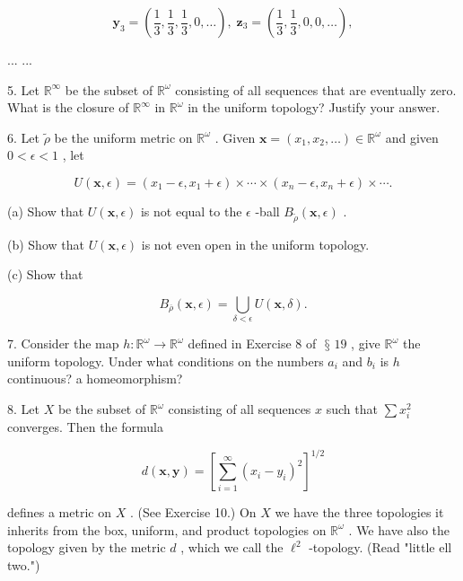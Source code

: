 \documentclass[10pt]{article}
\begin{document}
\[
{\mathbf{y}}_{3} = \left( {\frac{1}{3},\frac{1}{3},\frac{1}{3},0,\ldots }\right) ,\;{\mathbf{z}}_{3} = \left( {\frac{1}{3},\frac{1}{3},0,0,\ldots }\right) ,
\]

... ...

5. Let \({\mathbb{R}}^{\infty }\) be the subset of \({\mathbb{R}}^{\omega }\) consisting of all sequences that are eventually zero. What is the closure of \({\mathbb{R}}^{\infty }\) in \({\mathbb{R}}^{\omega }\) in the uniform topology? Justify your answer.

6. Let \(\widetilde{\rho }\) be the uniform metric on \({\mathbb{R}}^{\omega }\) . Given \(\mathbf{x} = \left( {{x}_{1},{x}_{2},\ldots }\right)  \in  {\mathbb{R}}^{\omega }\) and given \(0 < \epsilon  < 1\) , let

\[
U\left( {\mathbf{x},\epsilon }\right)  = \left( {{x}_{1} - \epsilon ,{x}_{1} + \epsilon }\right)  \times  \cdots  \times  \left( {{x}_{n} - \epsilon ,{x}_{n} + \epsilon }\right)  \times  \cdots .
\]

(a) Show that \(U\left( {\mathbf{x},\epsilon }\right)\) is not equal to the \(\epsilon\) -ball \({B}_{\widetilde{\rho }}\left( {\mathbf{x},\epsilon }\right)\) .

(b) Show that \(U\left( {\mathbf{x},\epsilon }\right)\) is not even open in the uniform topology.

(c) Show that

\[
{B}_{\overline{\rho }}\left( {\mathbf{x},\epsilon }\right)  = \mathop{\bigcup }\limits_{{\delta  < \epsilon }}U\left( {\mathbf{x},\delta }\right) .
\]

7. Consider the map \(h : {\mathbb{R}}^{\omega } \rightarrow  {\mathbb{R}}^{\omega }\) defined in Exercise 8 of \(\text{ § }{19}\) , give \({\mathbb{R}}^{\omega }\) the uniform topology. Under what conditions on the numbers \({a}_{i}\) and \({b}_{i}\) is \(h\) continuous? a homeomorphism?

8. Let \(X\) be the subset of \({\mathbb{R}}^{\omega }\) consisting of all sequences \(x\) such that \(\sum {x}_{i}^{2}\) converges. Then the formula

\[
d\left( {\mathbf{x},\mathbf{y}}\right)  = {\left\lbrack  \mathop{\sum }\limits_{{i = 1}}^{\infty }{\left( {x}_{i} - {y}_{i}\right) }^{2}\right\rbrack  }^{1/2}
\]

defines a metric on \(X\) . (See Exercise 10.) On \(X\) we have the three topologies it inherits from the box, uniform, and product topologies on \({\mathbb{R}}^{\omega }\) . We have also the topology given by the metric \(d\) , which we call the \({\ell }^{2}\) -topology. (Read "little ell two.")
\end{document}
